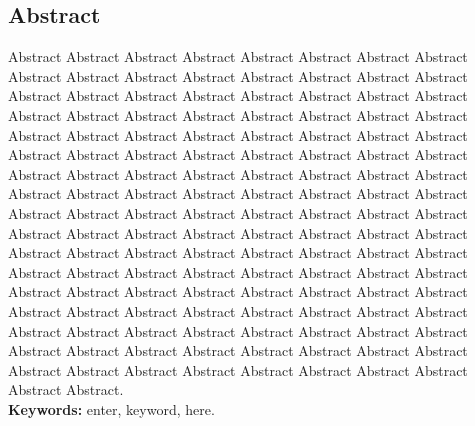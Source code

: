 \begin{center}
  \section*{Abstract}
\end{center}


\begin{spacing}{1.5}  
  Abstract Abstract Abstract Abstract Abstract Abstract Abstract Abstract Abstract Abstract Abstract Abstract Abstract Abstract Abstract Abstract Abstract Abstract Abstract Abstract Abstract Abstract Abstract Abstract Abstract Abstract Abstract Abstract Abstract Abstract Abstract Abstract Abstract Abstract Abstract Abstract Abstract Abstract Abstract Abstract Abstract Abstract Abstract Abstract Abstract Abstract Abstract Abstract Abstract Abstract Abstract Abstract Abstract Abstract Abstract Abstract Abstract Abstract Abstract Abstract Abstract Abstract Abstract Abstract Abstract Abstract Abstract Abstract Abstract Abstract Abstract Abstract Abstract Abstract Abstract Abstract Abstract Abstract Abstract Abstract Abstract Abstract Abstract Abstract Abstract Abstract Abstract Abstract Abstract Abstract Abstract Abstract Abstract Abstract Abstract Abstract Abstract Abstract Abstract Abstract Abstract Abstract Abstract Abstract Abstract Abstract Abstract Abstract Abstract Abstract Abstract Abstract Abstract Abstract Abstract Abstract Abstract Abstract Abstract Abstract Abstract Abstract Abstract Abstract Abstract Abstract Abstract Abstract Abstract Abstract Abstract Abstract Abstract Abstract Abstract Abstract Abstract Abstract.\\
  
  {\bf Keywords:} enter, keyword, here.
\end{spacing}
\clearpage